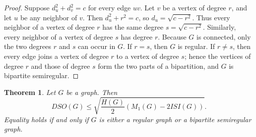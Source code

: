 \documentclass{article}
\newtheorem{theorem}{Theorem}
\theoremstyle{definition}
\begin{document}
\begin{proof}
Suppose $d_u^2+d_v^2 = c$ for every edge $uv$.
Let $v$ be a vertex of degree $r$, and let $u$ be any neighbor of $v$.
Then $d_u^2+r^2 = c$, so $d_u = \sqrt{c-r^2}$.
Thus every neighbor of a vertex of degree $r$ has the same degree
$s = \sqrt{c-r^2}$.
Similarly, every neighbor of a vertex of degree $s$ has degree $r$.
Because $G$ is connected, only the two degrees $r$ and $s$ can occur in $G$.
If $r=s$, then $G$ is regular.
If $r\neq s$, then every edge joins a vertex of degree $r$ to a vertex of degree $s$;
hence the vertices of degree $r$ and those of degree $s$ form the two parts of a bipartition,
and $G$ is bipartite semiregular.
\end{proof}


\begin{theorem}\label{DSO-H-ISI-M1}
Let $G$ be a  graph. Then
\[
DSO(G)\le \sqrt{\frac{H(G)}{2} \left(M_1(G)-2ISI(G)\right)}.
\]
Equality holds if and only if $G$ is either a regular graph or a bipartite semiregular graph.
\end{theorem}
\end{document}
